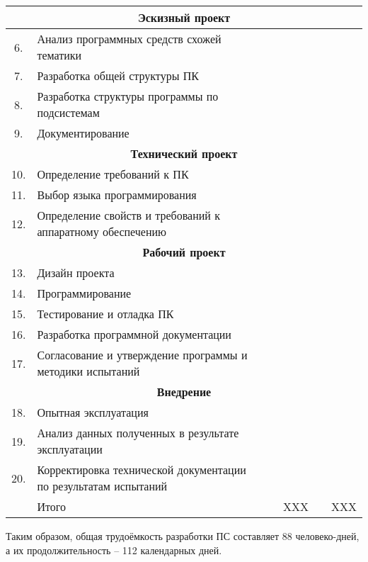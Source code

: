 \begin{center}
\begin{longtable}{|c|p{3.5cm}|c|c|c|c|c|}
\multicolumn{7}{|c|}{\textbf{Эскизный проект}} \\ \hline

6. & Анализ программных средств схожей тематики & & & & &\\ \hline
7. & Разработка общей структуры ПК & & & & &\\ \hline
8. & Разработка структуры программы по подсистемам & & & & &\\ \hline
9. & \hfill{}Документирование & & & & & \\ \hline

\multicolumn{7}{|c|}{\textbf{Технический проект}} \\ \hline

10. & Определение требований к ПК & & & & &\\ \hline
11. & Выбор языка программирования & & & & &\\ \hline
12. & Определение свойств и требований к аппаратному обеспечению & & & & &\\ \hline

\multicolumn{7}{|c|}{\textbf{Рабочий проект}} \\ \hline

13. & Дизайн проекта & & & & &\\ \hline
14. & \hfill{}Программирование & & & & &\\ \hline
15. & Тестирование и отладка ПК & & & & &\\ \hline
16. & Разработка программной документации & & & & & \\ \hline
17. & Согласование и утверждение программы и методики испытаний & & & & & \\ \hline

\multicolumn{7}{|c|}{\textbf{Внедрение}} \\ \hline

18. & Опытная эксплуатация & & & & &\\ \hline
19. & Анализ данных полученных в результате эксплуатации & & & & &\\ \hline
20. & Корректировка технической документации по результатам испытаний & & & & &\\ \hline

    & Итого & & & XXX & & XXX \\ \hline

\hline
\end{longtable}
\end{center}

Таким образом, общая трудоёмкость разработки ПС составляет  88 человеко-дней, а их продолжительность – 112 календарных дней.

